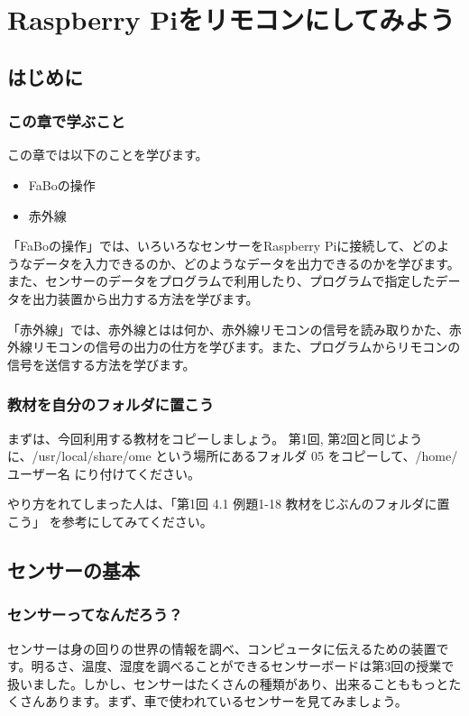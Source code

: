 \chapter{Raspberry Piをリモコンにしてみよう}
\section{はじめに}
\subsection{この章で学ぶこと}

この章では以下のことを学びます。
\begin{itemize}
\item FaBoの操作
\item 赤外線
\end{itemize}

「FaBoの操作」では、いろいろなセンサーをRaspberry Piに接続して、どのようなデータを入力できるのか、どのようなデータを出力できるのかを学びます。また、センサーのデータをプログラムで利用したり、プログラムで指定したデータを出力装置から出力する方法を学びます。

「赤外線」では、赤外線とはは何か、赤外線リモコンの信号を読み取りかた、赤外線リモコンの信号の出力の仕方を学びます。また、プログラムからリモコンの信号を送信する方法を学びます。

\subsection{教材を自分のフォルダに置こう}
まずは、今回利用する教材をコピーしましょう。
第1回, 第2回と同じように、\nobreak/usr/local/share/ome という場所にあるフォルダ 05 をコピーして、/home/ユーザー名 にり付けてください。

やり方をれてしまった人は、「第1回 4.1 例題1-18 教材をじぶんのフォルダに置こう」 を参考にしてみてください。


\section{センサーの基本}
\subsection{センサーってなんだろう？}
センサーは身の回りの世界の情報を調べ、コンピュータに伝えるための装置です。明るさ、温度、湿度を調べることができるセンサーボードは第3回の授業で扱いました。しかし、センサーはたくさんの種類があり、出来ることももっとたくさんあります。まず、車で使われているセンサーを見てみましょう。

